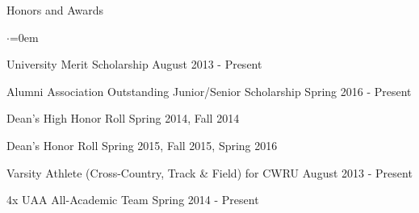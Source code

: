 \documentclass{resume} %
\begin{document}

\begin{rSection}{Honors and Awards}
\begin{list}{$\cdot$}{\leftmargin=0em}
\item University Merit Scholarship \hfill August 2013 - Present
\vspace{-0.5em}
\item Alumni Association Outstanding Junior/Senior Scholarship \hfill Spring 2016 - Present
\vspace{-0.5em}
\item Dean's High Honor Roll \hfill Spring 2014, Fall 2014
\vspace{-0.5em}
\item Dean's Honor Roll \hfill Spring 2015, Fall 2015, Spring 2016
\vspace{-0.5em}
\item Varsity Athlete (Cross-Country, Track \& Field) for CWRU \hfill{August 2013 - Present}
\vspace{-0.5em}
\item 4x UAA All-Academic Team \hfill{Spring 2014 - Present}
\vspace{-0.5em}
\end{list}


\end{rSection}

\end{document}
